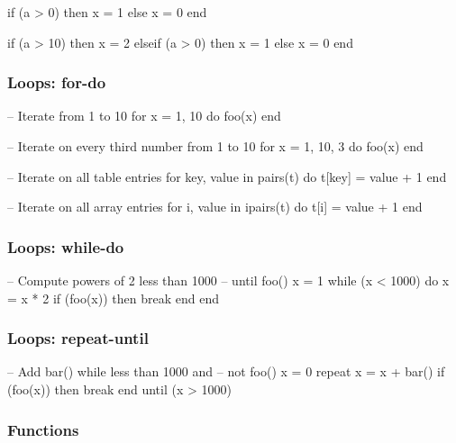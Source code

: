 \begin{LuaCode}
if (a > 0) then
	x = 1
else
	x = 0
end
\end{LuaCode}

\begin{LuaCode}
if (a > 10) then
	x = 2
elseif (a > 0) then
	x = 1
else
	x = 0
end
\end{LuaCode}

\subsubsection{Loops: for-do}

\begin{LuaCode}
-- Iterate from 1 to 10
for x = 1, 10 do
	foo(x)
end
\end{LuaCode}

\begin{LuaCode}
-- Iterate on every third number from 1 to 10
for x = 1, 10, 3 do
	foo(x)
end
\end{LuaCode}

\begin{LuaCode}
-- Iterate on all table entries
for key, value in pairs(t) do
	t[key] = value + 1
end
\end{LuaCode}

\begin{LuaCode}
-- Iterate on all array entries
for i, value in ipairs(t) do
	t[i] = value + 1
end
\end{LuaCode}

\subsubsection{Loops: while-do}

\begin{LuaCode}
-- Compute powers of 2 less than 1000
-- until foo()
x = 1
while (x < 1000) do
	x = x * 2
	if (foo(x)) then
		break
	end
end
\end{LuaCode}

\subsubsection{Loops: repeat-until}

\begin{LuaCode}
-- Add bar() while less than 1000 and
-- not foo()
x = 0
repeat
	x = x + bar()
	if (foo(x)) then
		break
	end
until (x > 1000)
\end{LuaCode}

\subsubsection{Functions}

